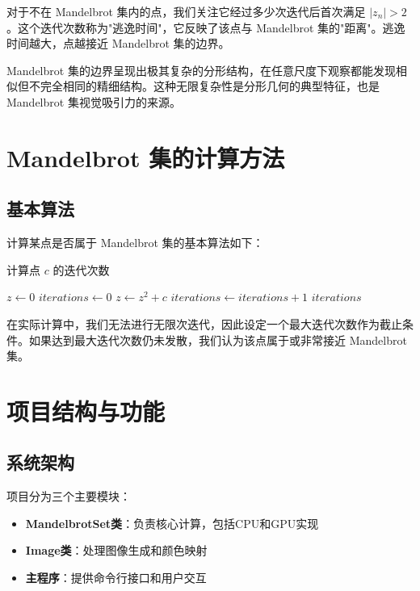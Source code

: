 \documentclass{article}
\begin{document}
对于不在 Mandelbrot 集内的点，我们关注它经过多少次迭代后首次满足 $|z_n| > 2$。这个迭代次数称为"逃逸时间"，它反映了该点与 Mandelbrot 集的"距离"。逃逸时间越大，点越接近 Mandelbrot 集的边界。

Mandelbrot 集的边界呈现出极其复杂的分形结构，在任意尺度下观察都能发现相似但不完全相同的精细结构。这种无限复杂性是分形几何的典型特征，也是 Mandelbrot 集视觉吸引力的来源。

\section{Mandelbrot 集的计算方法}

\subsection{基本算法}

计算某点是否属于 Mandelbrot 集的基本算法如下：

\begin{algorithm}
\caption{计算点 $c$ 的迭代次数}
\begin{algorithmic}[1]
    \State $z \gets 0$
    \State $iterations \gets 0$
        \State $z \gets z^2 + c$
        \State $iterations \gets iterations + 1$
    \EndWhile
    \State \Return $iterations$
\EndProcedure
\end{algorithmic}
\end{algorithm}

在实际计算中，我们无法进行无限次迭代，因此设定一个最大迭代次数作为截止条件。如果达到最大迭代次数仍未发散，我们认为该点属于或非常接近 Mandelbrot 集。

\section{项目结构与功能}

\subsection{系统架构}

项目分为三个主要模块：

\begin{itemize}
    \item \textbf{MandelbrotSet类}：负责核心计算，包括CPU和GPU实现
    \item \textbf{Image类}：处理图像生成和颜色映射
    \item \textbf{主程序}：提供命令行接口和用户交互
\end{itemize}
\end{document}

